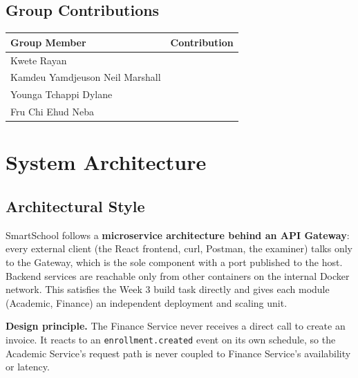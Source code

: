 \documentclass[11pt,a4paper]{report}
\newcommand{\sysname}{SmartSchool}
\begin{document}
\section{Group Contributions}
\begin{center}
\begin{tabular}{@{}p{5cm}p{9cm}@{}}
\toprule
\textbf{Group Member} & \textbf{Contribution} \\
\midrule
Kwete Rayan & \\[10pt]
Kamdeu Yamdjeuson Neil Marshall & \\[10pt]
Younga Tchappi Dylane & \\[10pt]
Fru Chi Ehud Neba & \\[10pt]
\bottomrule
\end{tabular}
\end{center}

\chapter{System Architecture}

\section{Architectural Style}
\sysname{} follows a \textbf{microservice architecture behind an API
Gateway}: every external client (the React frontend, curl, Postman, the
examiner) talks only to the Gateway, which is the sole component with a
port published to the host. Backend services are reachable only from other
containers on the internal Docker network. This satisfies the Week 3 build
task directly and gives each module (Academic, Finance) an independent
deployment and scaling unit.

\begin{infobox}
\textbf{Design principle.} The Finance Service never receives a direct call
to create an invoice. It reacts to an \texttt{enrollment.created} event on
its own schedule, so the Academic Service's request path is never coupled
to Finance Service's availability or latency.
\end{infobox}
\end{document}
